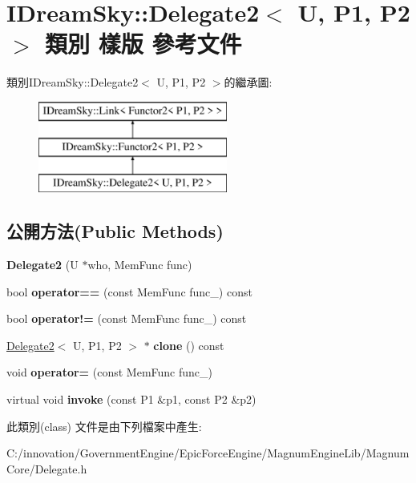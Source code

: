 \hypertarget{class_i_dream_sky_1_1_delegate2}{}\section{I\+Dream\+Sky\+:\+:Delegate2$<$ U, P1, P2 $>$ 類別 樣版 參考文件}
\label{class_i_dream_sky_1_1_delegate2}
類別\+I\+Dream\+Sky\+:\+:Delegate2$<$ U, P1, P2 $>$的繼承圖\+:\begin{figure}[H]
\begin{center}
\leavevmode
\includegraphics[height=3.000000cm]{class_i_dream_sky_1_1_delegate2}
\end{center}
\end{figure}
\subsection*{公開方法(Public Methods)}
\begin{DoxyCompactItemize}
\item 
{\bfseries Delegate2} (U $\ast$who, Mem\+Func func)\hypertarget{class_i_dream_sky_1_1_delegate2_ae6af49cd3976b5549064c69bc403c2f8}{}\label{class_i_dream_sky_1_1_delegate2_ae6af49cd3976b5549064c69bc403c2f8}

\item 
bool {\bfseries operator==} (const Mem\+Func func\+\_\+) const \hypertarget{class_i_dream_sky_1_1_delegate2_abd581102e5cd9837b4608d81d3d653a3}{}\label{class_i_dream_sky_1_1_delegate2_abd581102e5cd9837b4608d81d3d653a3}

\item 
bool {\bfseries operator!=} (const Mem\+Func func\+\_\+) const \hypertarget{class_i_dream_sky_1_1_delegate2_ab54f8ca5fdef5c013517fd36556c85e5}{}\label{class_i_dream_sky_1_1_delegate2_ab54f8ca5fdef5c013517fd36556c85e5}

\item 
\hyperlink{class_i_dream_sky_1_1_delegate2}{Delegate2}$<$ U, P1, P2 $>$ $\ast$ {\bfseries clone} () const \hypertarget{class_i_dream_sky_1_1_delegate2_aad7a227590af8fcffa99bd5684d82dec}{}\label{class_i_dream_sky_1_1_delegate2_aad7a227590af8fcffa99bd5684d82dec}

\item 
void {\bfseries operator=} (const Mem\+Func func\+\_\+)\hypertarget{class_i_dream_sky_1_1_delegate2_ab08d669b0e70dc2605b5a454e97c8756}{}\label{class_i_dream_sky_1_1_delegate2_ab08d669b0e70dc2605b5a454e97c8756}

\item 
virtual void {\bfseries invoke} (const P1 \&p1, const P2 \&p2)\hypertarget{class_i_dream_sky_1_1_delegate2_a53ef1dc968dec8270c93e35b21e86c48}{}\label{class_i_dream_sky_1_1_delegate2_a53ef1dc968dec8270c93e35b21e86c48}

\end{DoxyCompactItemize}


此類別(class) 文件是由下列檔案中產生\+:\begin{DoxyCompactItemize}
\item 
C\+:/innovation/\+Government\+Engine/\+Epic\+Force\+Engine/\+Magnum\+Engine\+Lib/\+Magnum\+Core/Delegate.\+h\end{DoxyCompactItemize}

